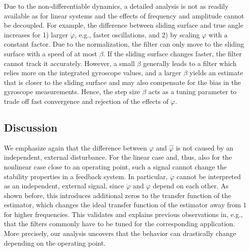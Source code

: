 Due to the non-differentiable dynamics, a detailed analysis is not as readily available as for linear systems and the effects of frequency and amplitude cannot be decoupled.
For example, the difference between sliding surface and true angle increases for 1) larger $\ddot{\varphi}$, e.g., faster oscillations, and 2) by scaling $\varphi$ with a constant factor.
Due to the normalization, the filter can only move to the sliding surface with a speed of at most $\beta$.
If the sliding surface changes faster, the filter cannot track it accurately.
However, a small $\beta$ generally leads to a filter which relies more on the integrated gyroscope values, and a larger $\beta$ yields an estimate that is closer to the sliding surface and may also compensate for the bias in the gyroscope measurements.
Hence, the step size $\beta$ acts as a tuning parameter to trade off fast convergence and rejection of the effects of $\ddot{\varphi}$.


\subsection{Discussion}
We emphasize again that the difference between $\varphi$ and $\hat{\varphi}$ is not caused by an independent, external disturbance.
For the linear case and, thus, also for the nonlinear case close to an operating point, such a signal cannot change the stability properties in a feedback system. 
In particular, $\ddot{\varphi}$ cannot be interpreted as an independent, external signal, since $\ddot{\varphi}$ and $\varphi$ depend on each other.
As shown before, this introduces additional zeros to the transfer function of the estimator, which changes the ideal transfer function of the estimator away from $1$ for higher frequencies.
This validates and explains previous observations in, e.g.,~\cite{Nazarahari2021} that the filters commonly have to be tuned for the corresponding application.
More precisely, our analysis uncovers that the behavior can drastically change depending on the operating point.


